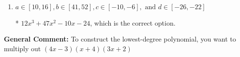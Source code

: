 \documentclass{extbook}[14pt]
\begin{document}
\begin{enumerate}
{\begin{enumerate}[label=\Alph*.]
$12x^{3} +65 x^{2} +74 x + 24$, which corresponds to multiplying out $(4x + 3)(x + 4)(3x + 2)$.
\item \( a \in [10, 16], b \in [41, 52], c \in [-10, -6], \text{ and } d \in [-26, -22] \)

* $12x^{3} +47 x^{2} -10 x -24$, which is the correct option.
\end{enumerate}

\textbf{General Comment:} To construct the lowest-degree polynomial, you want to multiply out $(4x -3)(x + 4)(3x + 2)$
}
\end{enumerate}
\end{document}

